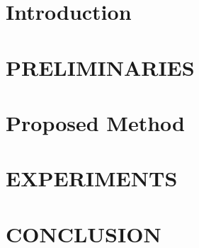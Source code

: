 \documentclass[10pt]{jarticle}
\begin{document}
\maketitle



\section{Introduction}\label{sec:Introduction}


\section{PRELIMINARIES}\label{sec:Preliminaries}


\section{Proposed Method}\label{sec:ProposedMethod}


\section{EXPERIMENTS}\label{sec:Experiments}


\section{CONCLUSION}\label{sec:Conclusion}


\begin{spacing}{0.9}
    
    \small
    \setlength{\itemsep}{0pt}
    
\end{spacing}

\end{document}
